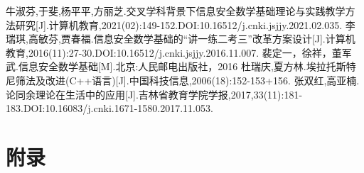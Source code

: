 \documentclass[UTF8]{ctexart}
\begin{document}
\newpage
\begin{thebibliography}{99}  
  牛淑芬,于斐,杨平平,方丽芝.交叉学科背景下信息安全数学基础理论与实践教学方法研究[J].计算机教育,2021(02):149-152.DOI:10.16512/j.cnki.jsjjy.2021.02.035.
  李瑞琪,高敏芬,贾春福.信息安全数学基础的“讲一练二考三”改革方案设计[J].计算机教育,2016(11):27-30.DOI:10.16512/j.cnki.jsjjy.2016.11.007.
  裴定一，徐祥，董军武.信息安全数学基础[M].北京:人民邮电出版社，2016
  杜瑞庆,夏方林.埃拉托斯特尼筛法及改进(C++语言)[J].中国科技信息,2006(18):152-153+156.
  张双红,高亚楠.论同余理论在生活中的应用[J].吉林省教育学院学报,2017,33(11):181-183.DOI:10.16083/j.cnki.1671-1580.2017.11.053.

  
  \end{thebibliography}
\newpage
\section*{附录}
\end{document}
